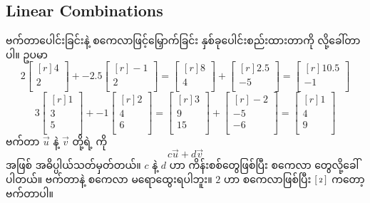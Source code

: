 \subsection*{Linear Combinations}
ဗက်တာပေါင်းခြင်းနဲ့ စကေလာဖြင့်မြှောက်ခြင်း နှစ်ခုပေါင်းစည်းထားတာကို  လို့ခေါ်တာပါ။ ဥပမာ
%
\[
2 \begin{bmatrix*}[r] 4\\ 2\\ \end{bmatrix*} 
                        + -2.5 \begin{bmatrix*}[r] -1\\ 2\\ \end{bmatrix*} 
                        = \begin{bmatrix*}[r] 8\\ 4\\ \end{bmatrix*} 
                            + \begin{bmatrix*}[r] 2.5\\ -5\\ \end{bmatrix*}
                        = \begin{bmatrix*}[r] 10.5\\ -1\\ \end{bmatrix*}
\]
%
%
\[
3 \begin{bmatrix*}[r] 1\\ 3\\ 5\\\end{bmatrix*} 
                        + -1 \begin{bmatrix*}[r] 2\\ 4\\ 6\\\end{bmatrix*} 
                        = \begin{bmatrix*}[r] 3\\ 9\\ 15\\\end{bmatrix*} 
                            + \begin{bmatrix*}[r] -2\\ -5\\ -6\\\end{bmatrix*}
                        = \begin{bmatrix*}[r] 1\\ 4\\ 9\\\end{bmatrix*}
\]
%
ဗက်တာ $\vec{u}$ နဲ့  $\vec{v}$ တို့ရဲ့  ကို 
\[
c\vec{u} + d\vec{v}    
    \]
အဖြစ် အဓိပ္ပါယ်သတ်မှတ်တယ်။ $c$ နဲ့ $d$ ဟာ ကိန်းစစ်တွေဖြစ်ပြီး စကေလာ  တွေလို့ခေါ်ပါတယ်။ ဗက်တာနဲ့ စကေလာ မရောထွေးရပါဘူး။ $2$ ဟာ စကေလာဖြစ်ပြီး \(\begin{bsmallmatrix*}[r] 2\\\end{bsmallmatrix*}\) ကတော့  ဗက်တာပါ။

